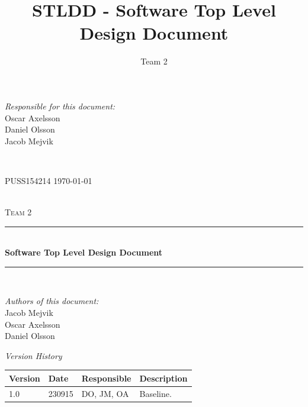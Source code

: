 \documentclass[a4paper]{article}
\title{STLDD - Software Top Level Design Document}
\author{Team 2}
\begin{document}
	\begin{titlepage}
		\newcommand{\HRule}{\rule{\linewidth}{0.5mm}}
		
		\begin{minipage}{0.5\textwidth}
			\begin{flushleft} %
				\textit{Responsible for this document:}\\
				Oscar Axelsson \\
				Daniel Olsson \\
				Jacob Mejvik
			\end{flushleft}
		\end{minipage}
		~
		\begin{minipage}{0.4\textwidth}
			\begin{flushright}
				PUSS154214
				\today
			\end{flushright}
		\end{minipage}\\[3cm]
		
		\centering
		\textsc{\LARGE Team 2}\\[0.5cm]
		
		\HRule \\[0.4cm]
		{ \huge \bfseries Software Top Level Design Document}\\[0.4cm] %
		\HRule \\[1.5cm]
		
		\vfill
		\begin{flushleft}
			\textit{Authors of this document:}\\
			Jacob Mejvik \\
			Oscar Axelsson \\
			Daniel Olsson
		\end{flushleft}
		
	\end{titlepage}
	\setcounter{tocdepth}{2}
	
	\begin{center}
		\textit{\large Version History}
		
		\begin{tabular}{ | l | l | l | p{5cm} |}
			\hline
			\textbf{Version} 	& \textbf{Date} 	& \textbf{Responsible} 	& \textbf{Description} 		\\ \hline
			1.0				 	& 230915 			& DO, JM, OA			&  Baseline. 				\\ \hline
		\end{tabular}
	\end{center}
	
\end{document}
